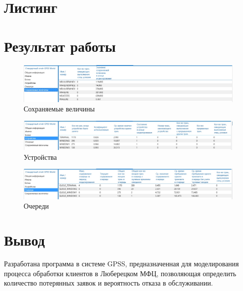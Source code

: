 \documentclass[a4paper,oneside,12pt]{extreport}
\begin{document}
\chapter{Листинг}



\chapter{Результат работы}

\begin{figure}[H]
	\centering
	\includegraphics[width=\linewidth]{inc/img/result-values.jpg}
	\caption{Сохраняемые величины}
\end{figure}

\begin{figure}[H]
	\centering
	\includegraphics[width=\linewidth]{inc/img/result-devices.jpg}
	\caption{Устройства}
\end{figure}

\begin{figure}[H]
	\centering
	\includegraphics[width=\linewidth]{inc/img/result-queues.jpg}
	\caption{Очереди}
\end{figure}

\chapter*{Вывод}

Разработана программа в системе GPSS, предназначенная для моделирования процесса обработки клиентов в Люберецком МФЦ, позволяющая определить количество потерянных заявок и вероятность отказа в обслуживании.
\end{document}
